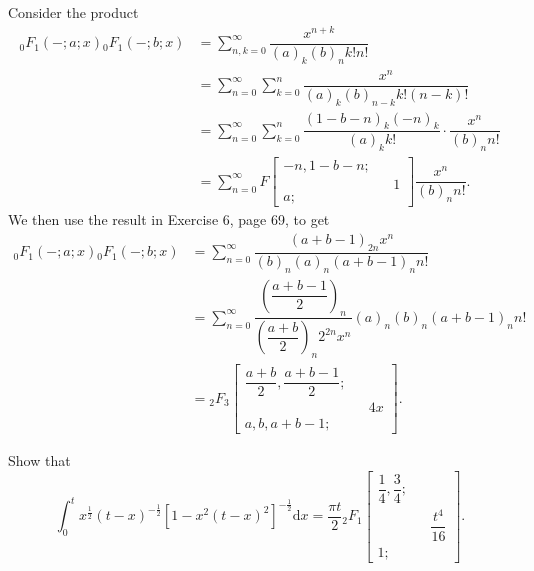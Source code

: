 \begin{solution}
Consider the product
$$\begin{array}{ll}
{}_0F_1(-;a;x) {}_0F_1(-;b;x) &= \displaystyle\sum_{n,k=0}^{\infty} \dfrac{x^{n+k}}{(a)_k (b)_n k! n!} \\
&= \displaystyle\sum_{n=0}^{\infty} \displaystyle\sum_{k=0}^{n} \dfrac{x^n}{(a)_k (b)_{n-k} k! (n-k)!} \\
&= \displaystyle\sum_{n=0}^{\infty} \displaystyle\sum_{k=0}^n \dfrac{(1-b-n)_k (-n)_k}{(a)_k k!} \cdot \dfrac{x^n}{(b)_n n!} \\
&= \displaystyle\sum_{n=0}^{\infty} F \left[ \begin{array}{rlr}
-n, 1-b-n; & & \\
& & 1 \\
a; & &
\end{array} \right] \dfrac{x^n}{(b)_n n!}.
\end{array}$$
We then use the result in Exercise 6, page 69, to get
$$\begin{array}{ll}
{}_0F_1(-;a;x) {}_0F_1(-;b;x) &= \displaystyle\sum_{n=0}^{\infty} \dfrac{(a+b-1)_{2n} x^n}{(b)_n (a)_n (a+b-1)_n n!} \\
&= \displaystyle\sum_{n=0}^{\infty} \dfrac{\left( \dfrac{a+b-1}{2} \right)_n}{\left( \dfrac{a+b}{2} \right)_n 2^{2n} x^n}{(a)_n (b)_n (a+b-1)_n n!} \\
&= {}_2F_3 \left[ \begin{array}{rlr}
\dfrac{a+b}{2}, \dfrac{a+b-1}{2}; & & \\
& & 4x \\
a,b,a+b-1; & &
\end{array} \right].
\end{array}$$
\end{solution}
\begin{problem}\label{problem2chapter5}
Show that 
$$\displaystyle\int_0^t x^{\frac{1}{2}} (t-x)^{-\frac{1}{2}}[1 - x^2(t-x)^2]^{-\frac{1}{2}} \mathrm{d}x = \dfrac{\pi t}{2} {}_2F_1 \left[ \begin{array}{rlr}
\dfrac{1}{4}, \dfrac{3}{4}; & & \\
& & \dfrac{t^4}{16} \\
1; & &
\end{array} \right].$$
\end{problem}
